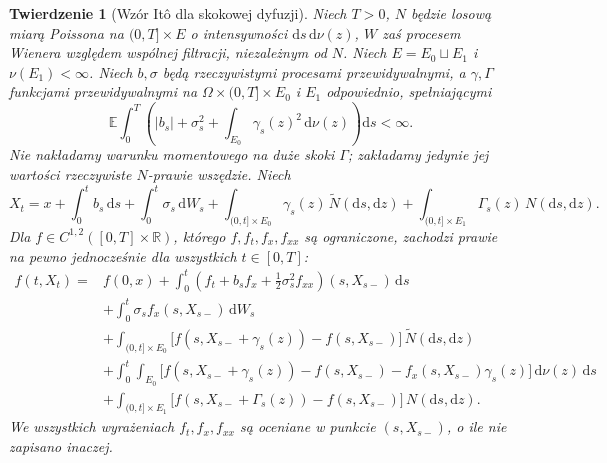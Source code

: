\documentclass[11pt,a4paper,oneside]{report}
\numberwithin{equation}{chapter}
\theoremstyle{plain}
\newtheorem{twierdzenie}{Twierdzenie}[chapter]
\theoremstyle{definition}
\theoremstyle{remark}
\newcommand{\R}{\mathbb{R}}
\newcommand{\E}{\mathbb{E}}
\newcommand{\dd}{\mathrm{d}}
\begin{document}
\begin{twierdzenie}[Wzór Itô dla skokowej dyfuzji]
\label{th:ito-jump-diffusion}
Niech $T>0$, $N$ będzie losową miarą Poissona na
$(0,T]\times E$ o intensywności $\dd s\,\dd\nu(z)$,
$W$ zaś procesem Wienera względem wspólnej filtracji,
niezależnym od $N$. Niech $E=E_0\sqcup E_1$ i
$\nu(E_1)<\infty$. Niech $b,\sigma$ będą rzeczywistymi
procesami przewidywalnymi, a $\gamma,\Gamma$ funkcjami
przewidywalnymi na $\Omega\times(0,T]\times E_0$ i $E_1$
odpowiednio, spełniającymi
\[
\E\int_0^T\left(|b_s|+\sigma_s^2+
\int_{E_0}\gamma_s(z)^2\,\dd\nu(z)\right)\dd s<\infty.
\]
Nie nakładamy warunku momentowego na duże skoki $\Gamma$;
zakładamy jedynie jej wartości rzeczywiste $N$-prawie wszędzie.
Niech
\[
X_t=x+\int_0^tb_s\,\dd s+\int_0^t\sigma_s\,\dd W_s
+\int_{(0,t]\times E_0}\gamma_s(z)\,\widetilde N(\dd s,\dd z)
+\int_{(0,t]\times E_1}\Gamma_s(z)\,N(\dd s,\dd z).
\]
Dla $f\in C^{1,2}([0,T]\times\R)$, którego
$f,f_t,f_x,f_{xx}$ są ograniczone, zachodzi prawie na pewno
jednocześnie dla wszystkich $t\in[0,T]$:
\[
\begin{split}
f(t,X_t)={}&f(0,x)
+\int_0^t\left(f_t+b_sf_x+\tfrac12\sigma_s^2f_{xx}\right)(s,X_{s-})\,\dd s\\
&+\int_0^t\sigma_s f_x(s,X_{s-})\,\dd W_s\\
&+\int_{(0,t]\times E_0}
\bigl[f(s,X_{s-}+\gamma_s(z))-f(s,X_{s-})\bigr]
\,\widetilde N(\dd s,\dd z)\\
&+\int_0^t\int_{E_0}
\bigl[f(s,X_{s-}+\gamma_s(z))-f(s,X_{s-})
-f_x(s,X_{s-})\gamma_s(z)\bigr] \,\dd\nu(z)\,\dd s\\
&+\int_{(0,t]\times E_1}
\bigl[f(s,X_{s-}+\Gamma_s(z))-f(s,X_{s-})\bigr]
\,N(\dd s,\dd z).
\end{split}
\tag{12.4}\label{eq:ito-jump-general}
\]
We wszystkich wyrażeniach $f_t,f_x,f_{xx}$ są oceniane
w punkcie $(s,X_{s-})$, o ile nie zapisano inaczej.
\end{twierdzenie}
\end{document}
